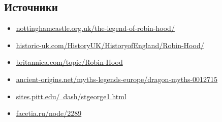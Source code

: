 \newpage

\subsection*{Источники}

\begin{itemize}
    \item \href{https://www.nottinghamcastle.org.uk/the-legend-of-robin-hood/}{nottinghamcastle.org.uk/the-legend-of-robin-hood/} \\
    \item \href{https://www.historic-uk.com/HistoryUK/HistoryofEngland/Robin-Hood/}{historic-uk.com/HistoryUK/HistoryofEngland/Robin-Hood/} \\
    \item \href{https://www.britannica.com/topic/Robin-Hood}{britannica.com/topic/Robin-Hood} \\
    \item \href{https://www.ancient-origins.net/myths-legends-europe/dragon-myths-0012715}{ancient-origins.net/myths-legends-europe/dragon-myths-0012715} \\
    \item \href{https://sites.pitt.edu/~dash/stgeorge1.html}{sites.pitt.edu/~dash/stgeorge1.html}
    \item \href{https://facetia.ru/node/2289}{facetia.ru/node/2289} \\
\end{itemize}


